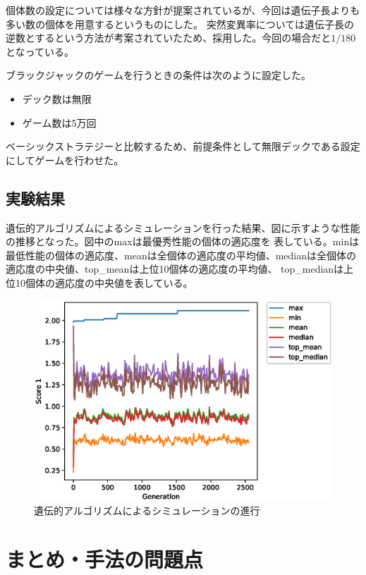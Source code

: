 個体数の設定については様々な方針が提案されているが、今回は遺伝子長よりも多い数の個体を用意するというものにした。
突然変異率については遺伝子長の逆数とするという方法が考案されていたため、採用した。今回の場合だと$1/180$となっている。

ブラックジャックのゲームを行うときの条件は次のように設定した。

\begin{itemize}
\item デック数は無限
\item ゲーム数は5万回
\end{itemize}

ベーシックストラテジーと比較するため、前提条件として無限デックである設定にしてゲームを行わせた。

\subsection{実験結果}
遺伝的アルゴリズムによるシミュレーションを行った結果、図に示すような性能の推移となった。図中のmaxは最優秀性能の個体の適応度を
表している。minは最低性能の個体の適応度、meanは全個体の適応度の平均値、medianは全個体の適応度の中央値、top\_meanは上位10個体の適応度の平均値、
top\_medianは上位10個体の適応度の中央値を表している。

  \begin{figure}[htbp]
    \includegraphics[width=14.0cm]{figure/gaprocess.eps}
    \caption{遺伝的アルゴリズムによるシミュレーションの進行}
    \label{gaprocess}
  \end{figure}


\section{まとめ・手法の問題点}